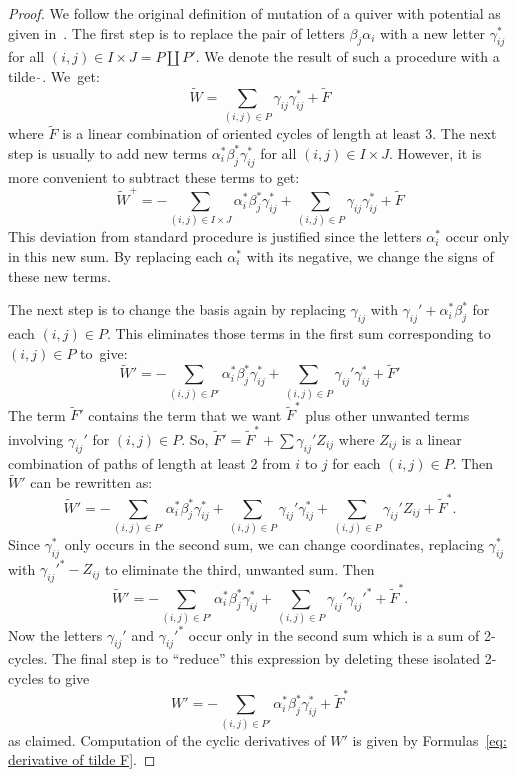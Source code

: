 \begin{proof}
We follow the original definition of mutation of a quiver with potential as given in~\cite{DWZ1}. The first step is to replace the pair of letters $\beta_j\alpha_i$ with a new letter $\gamma_{ij}^\ast$ for all $(i,j)\in I\times J=P\coprod P'$. We denote the result of such a procedure with a tilde $\widetilde\,$. We~get:
\[
	\widetilde W= \sum_{(i,j)\in P} \gamma_{ij}\gamma_{ij}^\ast + \widetilde F
\]
where $\widetilde F$ is a linear combination of oriented cycles of length at least 3. The next step is usually to add new terms $\alpha_i^\ast\beta_j^\ast\gamma_{ij}^\ast$ for all $(i,j)\in I\times J$. However, it is more convenient to subtract these terms to get:
\[
	\widetilde W^+=-\sum_{(i,j)\in I\times J} \alpha_i^\ast\beta_j^\ast\gamma_{ij}^\ast+ \sum_{(i,j)\in P} \gamma_{ij}\gamma_{ij}^\ast + \widetilde F
\]
This deviation from standard procedure is justified since the letters $\alpha_i^\ast$ occur only in this new sum. By replacing each $\alpha_i^\ast$ with its negative, we change the signs of these new terms.

The next step is to change the basis again by replacing $\gamma_{ij}$ with $\gamma_{ij}'+\alpha_i^\ast\beta_j^\ast$ for each $(i,j)\in P$. This eliminates those terms in the first sum corresponding to $(i,j)\in P$ to~give:
\[
	\widetilde W'=-\sum_{(i,j)\in P'} \alpha_i^\ast\beta_j^\ast\gamma_{ij}^\ast+ \sum_{(i,j)\in P} \gamma_{ij}'\gamma_{ij}^\ast + \widetilde F'
\]
The term $\widetilde F'$ contains the term that we want $\widetilde F^\ast$ plus other unwanted terms involving $\gamma_{ij}'$ for $(i,j)\in P$. So, $\widetilde F'=\widetilde F^\ast+\sum \gamma_{ij}'Z_{ij}$ where $Z_{ij}$ is a linear combination of paths of length at least 2 from $i$ to $j$ for each $(i,j)\in P$. Then $\widetilde W'$ can be rewritten as:
\[
	\widetilde W'=-\sum_{(i,j)\in P'} \alpha_i^\ast\beta_j^\ast\gamma_{ij}^\ast+ \sum_{(i,j)\in P} \gamma_{ij}'\gamma_{ij}^\ast+\sum_{(i,j)\in P} \gamma_{ij}'Z_{ij} + \widetilde F^\ast.
\]
Since $\gamma_{ij}^\ast$ only occurs in the second sum, we can change coordinates, replacing $\gamma_{ij}^\ast$ with $\gamma_{ij}'^{\ast}-Z_{ij}$ to eliminate the third, unwanted sum. Then
\[
	\widetilde W'=-\sum_{(i,j)\in P'} \alpha_i^\ast\beta_j^\ast\gamma_{ij}^\ast+ \sum_{(i,j)\in P} \gamma_{ij}'\gamma_{ij}'^\ast+ \widetilde F^\ast.
\]
Now the letters $\gamma_{ij}'$ and $\gamma_{ij}'^\ast$ occur only in the second sum which is a sum of 2-cycles. The final step is to ``reduce'' this expression by deleting these isolated 2-cycles to give
\[
	 W'=-\sum_{(i,j)\in P'} \alpha_i^\ast\beta_j^\ast\gamma_{ij}^\ast+  \widetilde F^\ast
\]
as claimed. Computation of the cyclic derivatives of $W'$ is given by Formulas~\ref{eq: derivative of tilde F}.
\end{proof}



